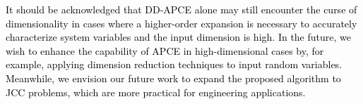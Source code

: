 \documentclass[journal]{IEEEtran}
\theoremstyle{definition}
\theoremstyle{remark}
\begin{document}
\textcolor{black}{It should be acknowledged that DD-APCE alone may still encounter the curse of dimensionality in cases where a higher-order expansion is necessary to accurately characterize system variables and the input dimension is high. In the future, we wish to enhance the capability of APCE in high-dimensional cases by, for example, applying dimension reduction techniques to input random variables. Meanwhile, we envision our future work to expand the proposed algorithm to JCC problems, which are more practical for engineering applications.} 

\ifCLASSOPTIONcaptionsoff
  \newpage
\fi






\end{document}
